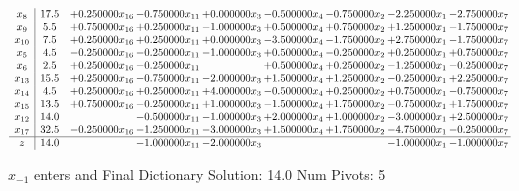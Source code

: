 \documentclass[10pt]{article}
\begin{document}
 \[\begin{array}{c| c c@{\hskip 2pt} c@{\hskip 2pt} c@{\hskip 2pt} c@{\hskip 2pt} c@{\hskip 2pt} c@{\hskip 2pt} c@{\hskip 2pt} }
 x_{8}   &  17.5 & + 0.250000 x_{16} & -0.750000 x_{11} & + 0.000000 x_{3} & -0.500000 x_{4} & -0.750000 x_{2} & -2.250000 x_{1} & -2.750000 x_{7}\\
 x_{9}   &  5.5 & + 0.750000 x_{16} & + 0.250000 x_{11} & -1.000000 x_{3} & + 0.500000 x_{4} & + 0.750000 x_{2} & + 1.250000 x_{1} & -1.750000 x_{7}\\
 x_{10}   &  7.5 & + 0.250000 x_{16} & + 0.250000 x_{11} & + 0.000000 x_{3} & -3.500000 x_{4} & -1.750000 x_{2} & + 2.750000 x_{1} & -1.750000 x_{7}\\
 x_{5}   &  4.5 & -0.250000 x_{16} & -0.250000 x_{11} & -1.000000 x_{3} & + 0.500000 x_{4} & -0.250000 x_{2} & + 0.250000 x_{1} & + 0.750000 x_{7}\\
 x_{6}   &  2.5 & + 0.250000 x_{16} & -0.250000 x_{11} &   & + 0.500000 x_{4} & + 0.250000 x_{2} & -1.250000 x_{1} & -0.250000 x_{7}\\
 x_{13}   &  15.5 & + 0.250000 x_{16} & -0.750000 x_{11} & -2.000000 x_{3} & + 1.500000 x_{4} & + 1.250000 x_{2} & -0.250000 x_{1} & + 2.250000 x_{7}\\
 x_{14}   &  4.5 & + 0.250000 x_{16} & + 0.250000 x_{11} & + 4.000000 x_{3} & -0.500000 x_{4} & + 0.250000 x_{2} & + 0.750000 x_{1} & -0.750000 x_{7}\\
 x_{15}   &  13.5 & + 0.750000 x_{16} & -0.250000 x_{11} & + 1.000000 x_{3} & -1.500000 x_{4} & + 1.750000 x_{2} & -0.750000 x_{1} & + 1.750000 x_{7}\\
 x_{12}   &  14.0  &   & -0.500000 x_{11} & -1.000000 x_{3} & + 2.000000 x_{4} & + 1.000000 x_{2} & -3.000000 x_{1} & + 2.500000 x_{7}\\
 x_{17}   &  32.5 & -0.250000 x_{16} & -1.250000 x_{11} & -3.000000 x_{3} & + 1.500000 x_{4} & + 1.750000 x_{2} & -4.750000 x_{1} & -0.250000 x_{7}\\
\hline
z    &  14.0  &   & -1.000000 x_{11} & -2.000000 x_{3} &    &   & -1.000000 x_{1} & -1.000000 x_{7}\\
\end{array}\]


 $ x_{-1} $ enters and Final Dictionary
Solution:  14.0
Num Pivots:  5
\end{document}
